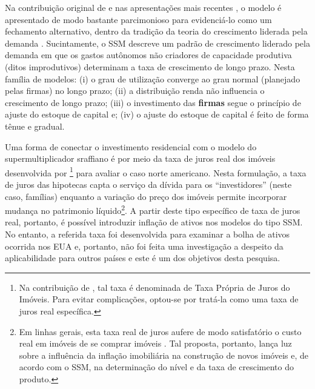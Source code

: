 Na contribuição original de \textcite{serrano_sraffian_1995} e nas apresentações mais recentes \cite{freitas_growth_2015}, o modelo é apresentado de modo bastante parcimonioso para evidenciá-lo como um fechamento alternativo, dentro da tradição da teoria do crescimento liderada pela demanda \cite{serrano_sraffian_2017}. 
Sucintamente, o SSM descreve um padrão de crescimento liderado pela demanda em que os gastos autônomos não criadores de capacidade produtiva (ditos improdutivos) determinam a taxa de crescimento de longo prazo. 
Nesta família de modelos: 
	(i) o grau de utilização converge ao grau normal (planejado pelas firmas) no longo prazo; 
	(ii) a distribuição renda não influencia o crescimento de longo prazo; 
	(iii) o investimento das \textbf{firmas} segue o princípio de ajuste do estoque de capital e;
	(iv) o ajuste do estoque de capital é feito de forma tênue e gradual. 
	
Uma forma de conectar o investimento residencial com o modelo do supermultiplicador sraffiano é por meio da taxa de juros real dos imóveis desenvolvida por \textcite{teixeira_crescimento_2015}\footnote{Na contribuição de \textcite{teixeira_crescimento_2015}, tal taxa é denominada de Taxa Própria de Juros do Imóveis. Para evitar complicações, optou-se por tratá-la como uma taxa de juros real específica.} para avaliar o caso norte americano. Nesta formulação, a taxa de juros das hipotecas capta o serviço da dívida para os ``investidores'' (neste caso, famílias) enquanto a variação do preço dos imóveis permite incorporar mudança no patrimonio líquido\footnote{Em linhas gerais, esta taxa real de juros aufere de modo satisfatório o custo real em imóveis de se comprar imóveis \cite[p.~53]{teixeira_crescimento_2015}. Tal proposta, portanto, lança luz sobre a influência da inflação imobiliária na construção de novos imóveis e, de acordo com o SSM, na determinação do nível e da taxa de crescimento do produto.}. 
A partir deste tipo específico de taxa de juros real, portanto, é possível introduzir inflação de ativos nos modelos do tipo SSM. No entanto, a referida taxa foi desenvolvida para examinar a bolha de ativos ocorrida nos EUA e, portanto, não foi feita uma investigação a despeito da aplicabilidade para outros países e este é um dos objetivos desta pesquisa.


